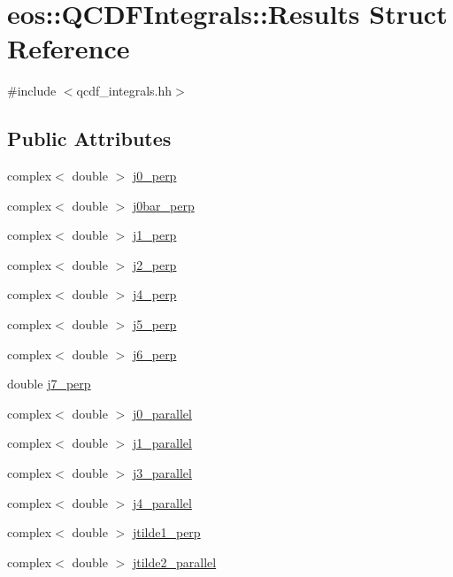 \hypertarget{structeos_1_1QCDFIntegrals_1_1Results}{
\section{eos::QCDFIntegrals::Results Struct Reference}
\label{structeos_1_1QCDFIntegrals_1_1Results}
}


{\ttfamily \#include $<$qcdf\_\-integrals.hh$>$}\subsection*{Public Attributes}
\begin{DoxyCompactItemize}
\item 
complex$<$ double $>$ \hyperlink{structeos_1_1QCDFIntegrals_1_1Results_a0a54f336f6b2c1c872ca0960019364e0}{j0\_\-perp}
\item 
complex$<$ double $>$ \hyperlink{structeos_1_1QCDFIntegrals_1_1Results_a955c86eea4fcade3cb1c933bc37f045f}{j0bar\_\-perp}
\item 
complex$<$ double $>$ \hyperlink{structeos_1_1QCDFIntegrals_1_1Results_a17ec95c05f9109e6d5d2c7af30a2cc3c}{j1\_\-perp}
\item 
complex$<$ double $>$ \hyperlink{structeos_1_1QCDFIntegrals_1_1Results_a75e99af294c74a56ecc0d22a6830ad51}{j2\_\-perp}
\item 
complex$<$ double $>$ \hyperlink{structeos_1_1QCDFIntegrals_1_1Results_a63ff0de751641de0e53a9526d4edbbc5}{j4\_\-perp}
\item 
complex$<$ double $>$ \hyperlink{structeos_1_1QCDFIntegrals_1_1Results_a2ae09761e83ba1fb4836b5f12b13d963}{j5\_\-perp}
\item 
complex$<$ double $>$ \hyperlink{structeos_1_1QCDFIntegrals_1_1Results_a9b10eac176e6e81b3facb715dd7d7ed0}{j6\_\-perp}
\item 
double \hyperlink{structeos_1_1QCDFIntegrals_1_1Results_a2c91f80cbe8263e2778d134911e12820}{j7\_\-perp}
\item 
complex$<$ double $>$ \hyperlink{structeos_1_1QCDFIntegrals_1_1Results_a3f70a602dc4afa4c37edff48032487c5}{j0\_\-parallel}
\item 
complex$<$ double $>$ \hyperlink{structeos_1_1QCDFIntegrals_1_1Results_a0f526f7579916a3a6d0ae2b8262a785c}{j1\_\-parallel}
\item 
complex$<$ double $>$ \hyperlink{structeos_1_1QCDFIntegrals_1_1Results_a5ba2925f4fa9f5425e4af1349aa1f7c4}{j3\_\-parallel}
\item 
complex$<$ double $>$ \hyperlink{structeos_1_1QCDFIntegrals_1_1Results_aba4329760d20d62cec5824c940026f98}{j4\_\-parallel}
\item 
complex$<$ double $>$ \hyperlink{structeos_1_1QCDFIntegrals_1_1Results_affa81425a4a26725aec429cac18c363c}{jtilde1\_\-perp}
\item 
complex$<$ double $>$ \hyperlink{structeos_1_1QCDFIntegrals_1_1Results_ae93c8c7a9f37dfc2f2a71bf76afc78fa}{jtilde2\_\-parallel}
\end{DoxyCompactItemize}


